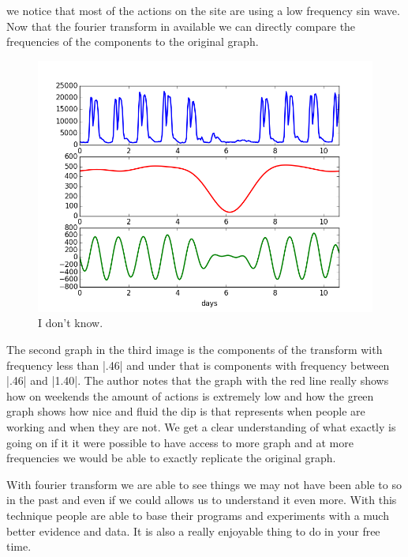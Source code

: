 \documentclass [../article.tex]{subfiles}
\begin{document}
  we notice that most of the actions on the site are using a low
  frequency sin wave. Now that the fourier transform in available
  we can directly compare the frequencies of the components to the
  original graph.
  \begin{figure}[h!]
    \includegraphics[width=\linewidth]{../img/evar/7.png}
    \caption{I don't know.}
    \label{fig:idk}
  \end{figure}
  The second graph in the third image is the components of the
  transform with frequency less than |.46| and under that is
  components with frequency between |.46| and |1.40|.  The author
  notes that  the graph with the red line really shows how on
  weekends the amount of actions is extremely low and how the
  green graph shows how nice and fluid the dip is that represents
  when people are working and when they are not. We get a clear
  understanding of what exactly is going on if it it were possible
  to have access to more graph and at more frequencies we would be
  able to exactly replicate the original graph.

	With fourier transform we are able to see things we may not have
  been able to so in the past and even if we could allows us to
  understand it even more. With this technique people are able to
  base their programs and experiments with a much better evidence
  and data. It is also a really enjoyable thing to do in your free
  time.
\end{document}

